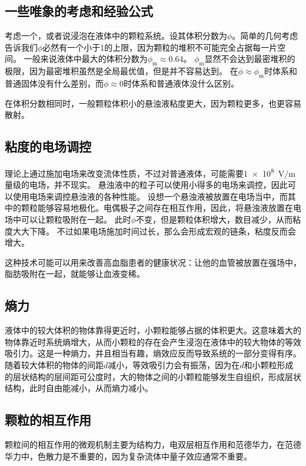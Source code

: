 \subsection{一些唯象的考虑和经验公式}

考虑一个，或者说浸泡在液体中的颗粒系统。设其体积分数为$\phi$。简单的几何考虑告诉我们$\phi$必然有一个小于1的上限，因为颗粒的堆积不可能完全占据每一片空间。
一般来说液体中最大的体积分数为$\phi_\text{m} \approx 0.64$。
$\phi_\text{m}$显然不会达到最密堆积的极限，因为最密堆积虽然是全局最优值，但是并不容易达到。
在$\phi \approx \phi_\text{m}$时体系和普通固体没有什么差别，而$\phi \approx 0$时体系和普通液体没什么区别。

在体积分数相同时，一般颗粒体积小的悬浊液粘度更大，因为颗粒更多，也更容易散射。

\subsection{粘度的电场调控}

理论上通过施加电场来改变流体性质，不过对普通液体，可能需要\SI{1e8}{V/m}量级的电场，并不现实。
悬浊液中的粒子可以使用小得多的电场来调控，因此可以使用电场来调控悬浊液的各种性能。
设想一个悬浊液被放置在电场当中，而其中的颗粒能够容易地极化。电偶极子之间存在相互作用，因此，将悬浊液放置在电场中可以让颗粒吸附在一起。
此时$\phi$不变，但是颗粒体积增大，数目减少，从而粘度大大下降。
不过如果电场施加时间过长，那么会形成宏观的链条，粘度反而会增大。

这种技术可能可以用来改善高血脂患者的健康状况：让他的血管被放置在强场中，脂肪吸附在一起，就能够让血液变稀。

\subsection{熵力}

液体中的较大体积的物体靠得更近时，小颗粒能够占据的体积更大。这意味着大的物体靠近时系统熵增大，从而小颗粒的存在会产生浸泡在液体中的较大物体的等效吸引力。这是一种熵力，并且相当有趣，熵效应反而导致系统的一部分变得有序。
随着较大体积的物体的间距$d$减小，等效吸引力会有振荡，因为在$d$和小颗粒形成的层状结构的层间距可公度时，大的物体之间的小颗粒能够发生自组织，形成层状结构，此时自由能减小，从而熵力减小。

\subsection{颗粒的相互作用}

颗粒间的相互作用的微观机制主要为结构力，电双层相互作用和范德华力，在范德华力中，色散力是不重要的，因为复杂流体中量子效应通常不重要。

